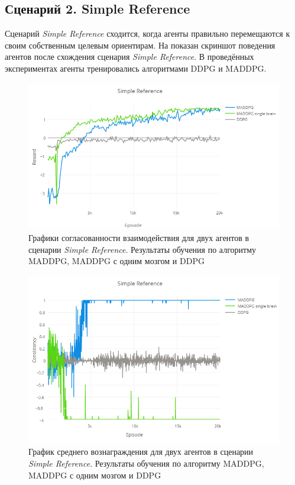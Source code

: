 \subsection{Сценарий 2. Simple Reference}

Сценарий \textit{Simple Reference} сходится, когда агенты правильно перемещаются к своим собственным целевым ориентирам. На  показан скриншот поведения агентов после схождения сценария \textit{Simple Reference}. В проведённых экспериментах агенты тренировались алгоритмами DDPG и MADDPG.

\begin{figure}[ht!]
	\center
	\includegraphics [scale=0.6] {my_folder/images/ch5/sr-rew.png}
	\caption{Графики согласованности взаимодействия для двух агентов в сценарии \textit{Simple Reference}. Результаты обучения по алгоритму MADDPG, MADDPG с одним мозгом и DDPG}
	\label{fig:result-sr-rew}
\end{figure}

\begin{figure}[ht!]
	\center
	\includegraphics [scale=0.6] {my_folder/images/ch5/sr-comm.png}
	\caption{График среднего вознаграждения для двух агентов в сценарии \textit{Simple Reference}. Результаты обучения по алгоритму MADDPG, MADDPG с одним мозгом и DDPG}
	\label{fig:result-sr-comm}
\end{figure}

